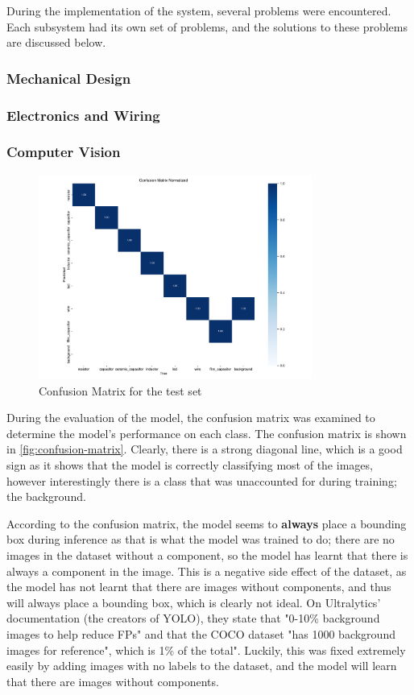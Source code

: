 During the implementation of the system, several problems were encountered. Each subsystem had its own set of problems, and the solutions to these problems are discussed below.

\subsubsection{Mechanical Design}

\subsubsection{Electronics and Wiring}

\subsubsection{Computer Vision}

\begin{figure}[H]
    \centering
    \includegraphics[width=0.8\textwidth]{imgs/graphs/confusion_matrix_test.png}
    \caption{Confusion Matrix for the test set}
    \label{fig:confusion-matrix}
  \end{figure}

During the evaluation of the model, the confusion matrix was examined to determine the model's performance on each class. The confusion matrix is shown in \autoref{fig:confusion-matrix}. Clearly, there is a strong diagonal line, which is a good sign as it shows that the model is correctly classifying most of the images, however interestingly there is a class that was unaccounted for during training; the background. 

According to the confusion matrix, the model seems to \textbf{always} place a bounding box during inference as that is what the model was trained to do; there are no images in the dataset without a component, so the model has learnt that there is always a component in the image. This is a negative side effect of the dataset, as the model has not learnt that there are images without components, and thus will always place a bounding box, which is clearly not ideal. On Ultralytics' documentation \cite{ultralytics_2023} (the creators of YOLO), they state that "0-10\% background images to help reduce FPs" and that the COCO dataset "has 1000 background images for reference", which is 1\% of the total". Luckily, this was fixed extremely easily by adding images with no labels to the dataset, and the model will learn that there are images without components.

